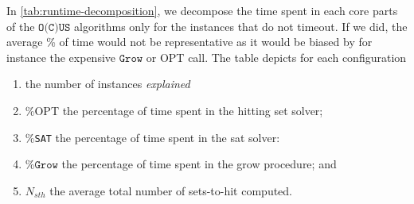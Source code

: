 \documentclass[a4paper,UKenglish,cleveref, autoref, thm-restate, pdfa]{lipics-v2021}
\renewcommand\comment[1]{}
\newcommand{\emilio}[1]{{\comment{\color{red}Emilio: #1}}}
\newcommand\mm[1]{\ensuremath{#1}\xspace}
\newcommand\call[1]{\mm{\texttt{#1}}}
\newcommand\sat{\texttt{{SAT}}\xspace}
\newcommand\grow{\mm{\call{Grow}}}
\newcommand\comus{\mm{\call{OCUS}}}
\newcommand\ousb{\mm{\call{OCUS\_Bounded}}}
\newcommand\ousbiter{\mm{\call{OCUSIter}}}
\newcommand\ousbincr{\mm{\call{OCUSb+Lit.~Incr.~HS}}}
\newcommand\ousbiterincr{\mm{\call{OCUSIter+Lit.~Incr.~HS}}}
\begin{document}
		In \cref{tab:runtime-decomposition}, we decompose the time spent in each core parts of the \call{O(C)US} algorithms only for the instances that do not timeout. If we did, the average \% of time would not be representative as it would be biased by for instance the expensive \grow or \textsc{OPT} call. 
		The table depicts for each configuration 
		\begin{enumerate}%
			\item the number of instances \emph{explained}
			\item \%\textsc{OPT} the percentage of time spent in the hitting set solver;
			\item \%\sat the percentage of time spent in the sat solver:
			\item \%\grow the percentage of time spent in the grow procedure; and
			\item $N_{sth}$ the average total number of sets-to-hit computed.
		\end{enumerate}
		
\end{document}
